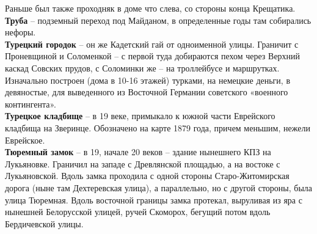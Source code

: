 Раньше был также проходняк в доме что слева, со стороны конца Крещатика.\\


\textbf{Труба} – подземный переход под Майданом, в определенные годы там собирались нефоры.\\


\textbf{Турецкий городок} – он же Кадетский гай от одноименной улицы. Граничит с Проневщиной и Соломенкой – с первой туда добираются пехом через Верхний каскад Совских прудов, с Соломинки же – на троллейбусе и маршрутках. Изначально построен (дома в 10-16 этажей) турками, на немецкие деньги, в девяностые, для выведенного из Восточной Германии советского «военного контингента».\\

\textbf{Турецкое кладбище} – в 19 веке, примыкало к южной части Еврейского кладбища на Зверинце. Обозначено на карте 1879 года, причем меньшим, нежели Еврейское.\\

\textbf{Тюремный замок} – в 19, начале 20 веков – здание нынешнего КПЗ на Лукьяновке. Граничил на западе с Древлянской площадью, а на востоке с Лукьяновской. Вдоль замка проходила с одной стороны Старо-Житомирская дорога (ныне там Дехтеревская улица), а параллельно, но с другой стороны, была улица Тюремная. Вдоль восточной границы замка протекал, выруливая из яра с нынешней Белорусской улицей, ручей Скоморох, бегущий потом вдоль Бердичевской улицы.
